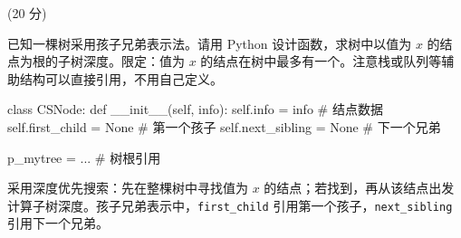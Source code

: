 \begin{question}[求子树深度](20 分)

已知一棵树采用孩子兄弟表示法。请用 Python 设计函数，求树中以值为 $x$ 的结点为根的子树深度。限定：值为 $x$ 的结点在树中最多有一个。注意栈或队列等辅助结构可以直接引用，不用自己定义。

\begin{pycode}
class CSNode:
    def __init__(self, info):
        self.info = info          # 结点数据
        self.first_child = None   # 第一个孩子
        self.next_sibling = None  # 下一个兄弟

p_mytree = ...                    # 树根引用
\end{pycode}

\begin{solution}
采用深度优先搜索：先在整棵树中寻找值为 $x$ 的结点；若找到，再从该结点出发计算子树深度。孩子兄弟表示中，\texttt{first\_child} 引用第一个孩子，\texttt{next\_sibling} 引用下一个兄弟。


\end{solution}
\end{question}
